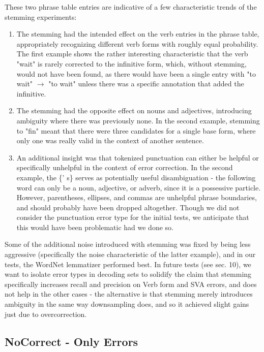 \documentclass[11pt,letterpaper]{article}
\begin{document}
These two phrase table entries are indicative of a few characteristic trends of the stemming experiments:
\begin{enumerate}
  \item The stemming had the intended effect on the verb entries in the phrase table, appropriately recognizing different verb forms with roughly equal probability. The first example shows the rather interesting characteristic that the verb "wait" is rarely corrected to the infinitive form, which, without stemming, would not have been found, as there would have been a single entry with "to wait" $\rightarrow$ "to wait" unless there was a specific annotation that added the infinitive.

  \item The stemming had the opposite effect on nouns and adjectives, introducing ambiguity where there was previously none. In the second example, stemming to "fin" meant that there were three candidates for a single base form, where only one was really valid in the context of another sentence. 

  \item An additional insight was that tokenized punctuation can either be helpful or specifically unhelpful in the context of error correction. In the second example, the \{' s\} serves as potentially useful disambiguation - the following word can only be a noun, adjective, or adverb, since it is a possessive particle. However, parentheses, ellipses, and commas are unhelpful phrase boundaries, and should probably have been dropped altogether. Though we did not consider the punctuation error type for the initial tests, we anticipate that this would have been problematic had we done so.
  
\end{enumerate}

Some of the additional noise introduced with stemming was fixed by being less aggressive (specifically the noise characteristic of the latter example), and in our tests, the WordNet lemmatizer performed best. In future tests (see sec. 10), we want to isolate error types in decoding sets to solidify the claim that stemming specifically increases recall and precision on Verb form and SVA errors, and does not help in the other cases - the alternative is that stemming merely introduces ambiguity in the same way downsampling does, and so it achieved slight gains just due to overcorrection.

\subsection{NoCorrect - Only Errors}
\end{document}
